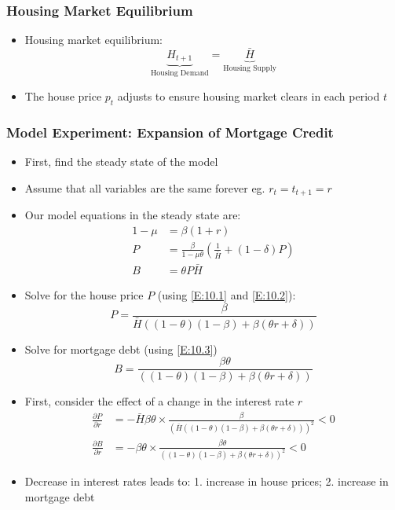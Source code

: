 \documentclass[a4paper,twoside]{article}
\numberwithin{equation}{section}
\numberwithin{figure}{section}
\begin{document}
\subsubsection{Housing Market Equilibrium}
	\begin{itemize}
		\item Housing market equilibrium:
		\[
			\underbrace{H_{t+1}}_\text{Housing Demand} = \underbrace{\bar{H}}_\text{Housing Supply}
		\]
		\item The house price \( p_t \) adjusts to ensure housing market clears in each period \( t \)
	\end{itemize}
\subsubsection{Model Experiment: Expansion of Mortgage Credit}
	\begin{itemize}
		\item First, find the \textcolor{myblue}{steady state} of the model
		\item Assume that all variables are the same forever eg. \( r_t=t_{t+1}=r \)
		\item Our model equations in the steady state are:
		\begin{align}
			1-\mu &= \beta(1+r) \label{E:10.1}\\
			P &= \frac{\beta}{1-\mu\theta} \left( \frac{1}{\bar{H}} + (1-\delta)P \right) \label{E:10.2}\\
			B &= \theta P\bar{H} \label{E:10.3}
		\end{align}
		\item Solve for the house price \( P \) (using \cref{E:10.1} and \cref{E:10.2}):
		\[
			P = \frac{\beta}{\bar{H}((1-\theta)(1-\beta)+\beta(\theta r+\delta))}
		\]
		\item Solve for mortgage debt (using \cref{E:10.3})
		\[
			B = \frac{\beta\theta}{((1-\theta)(1-\beta)+\beta(\theta r+\delta))}
		\]
		\item First, consider the effect of a \textcolor{myblue}{change in the interest rate \( \mathit{r} \)}
		\begin{align*}
			\frac{\partial P}{\partial r} &= -\bar{H}\beta\theta \times \frac{\beta}{(\bar{H}((1-\theta)(1-\beta)+\beta(\theta r+\delta)))^2} <0\\
			\frac{\partial B}{\partial r} &= -\beta\theta \times \frac{\beta\theta}{((1-\theta)(1-\beta)+\beta(\theta r+\delta))^2} <0
		\end{align*}
		\item Decrease in interest rates leads to: 1. \textcolor{myblue}{increase in house prices}; 2. \textcolor{myblue}{increase in mortgage debt}

\end{itemize}
\end{document}
